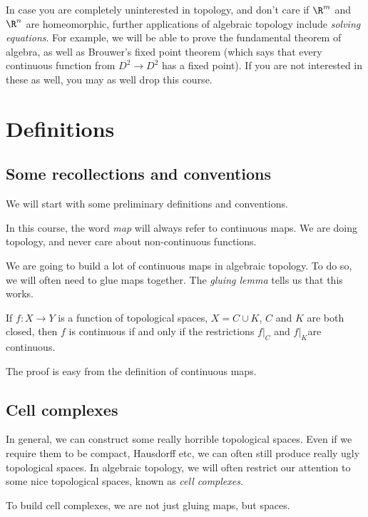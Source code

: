 \documentclass[a4paper]{article}
\begin{document}
In case you are completely uninterested in topology, and don't care if $\R^m$ and $\R^n$ are homeomorphic, further applications of algebraic topology include \emph{solving equations}. For example, we will be able to prove the fundamental theorem of algebra, as well as Brouwer's fixed point theorem (which says that every continuous function from $D^2 \to D^2$ has a fixed point). If you are not interested in these as well, you may as well drop this course.

\section{Definitions}
\subsection{Some recollections and conventions}
We will start with some preliminary definitions and conventions.

\begin{defi}[Map]
  In this course, the word \emph{map} will always refer to continuous maps. We are doing topology, and never care about non-continuous functions.
\end{defi}

We are going to build a lot of continuous maps in algebraic topology. To do so, we will often need to glue maps together. The \emph{gluing lemma} tells us that this works.
\begin{lemma}
  If $f: X\to Y$ is a function of topological spaces, $X = C\cup K$, $C$ and $K$ are both closed, then $f$ is continuous if and only if the restrictions $f|_C$ and $f|_K$are continuous.
\end{lemma}
The proof is easy from the definition of continuous maps.

\subsection{Cell complexes}
In general, we can construct some really horrible topological spaces. Even if we require them to be compact, Hausdorff etc, we can often still produce really ugly topological spaces. In algebraic topology, we will often restrict our attention to some nice topological spaces, known as \emph{cell complexes}.

To build cell complexes, we are not just gluing maps, but spaces.
\end{document}
